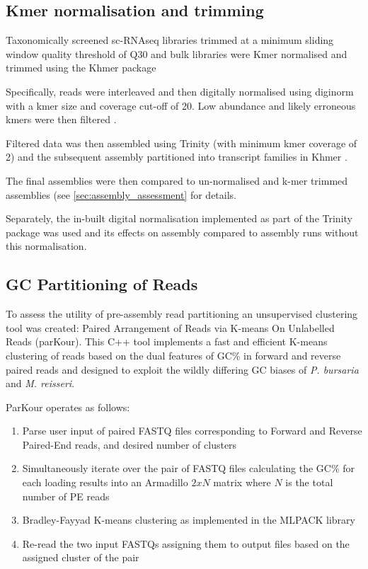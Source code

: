 \subsection{Kmer normalisation and trimming}

Taxonomically screened sc-RNAseq libraries trimmed at a minimum sliding window quality
threshold of Q30 and bulk libraries were Kmer normalised and trimmed using the Khmer package \citep{Crusoe2015}

Specifically, reads were interleaved \citep{Doring2008} and then digitally normalised using diginorm \citep{Brown2012}
with a kmer size and coverage cut-off of 20.  Low abundance and likely erroneous
kmers were then filtered \citep{Zhang2015,Zhang2014}.  

Filtered data was then assembled using Trinity (with minimum kmer coverage of 2) 
and the subsequent assembly partitioned into transcript families in Khmer \citep{Pell2012}.

The final assemblies were then compared to un-normalised and k-mer trimmed assemblies 
(see \ref{sec:assembly_assessment} for details.

Separately, the in-built digital normalisation implemented as part of the Trinity package
was used and its effects on assembly compared to assembly runs without this normalisation.

\subsection{GC Partitioning of Reads}

To assess the utility of pre-assembly read partitioning an unsupervised clustering tool was created:
Paired Arrangement of Reads via K-means On Unlabelled Reads (parKour).
This C++ tool implements a fast and efficient K-means clustering of reads based on the dual features
of GC\% in forward and reverse paired reads and designed to exploit the wildly differing GC
biases of \textit{P. bursaria} and \textit{M. reisseri}.

ParKour operates as follows:
\begin{enumerate}
    \item Parse user input of paired FASTQ files corresponding to Forward and Reverse Paired-End reads, and desired number of clusters
    \item Simultaneously iterate over the pair of FASTQ files calculating the GC\% for each loading results into an Armadillo \(2xN\) matrix \citep{Sanderson2010} where \(N\) is the total number of PE reads
    \item Bradley-Fayyad K-means \citep{Bradley1998} clustering as implemented in the MLPACK library \citep{mlpack2013}
    \item Re-read the two input FASTQs assigning them to output files based on the assigned cluster of the pair
\end{enumerate}


